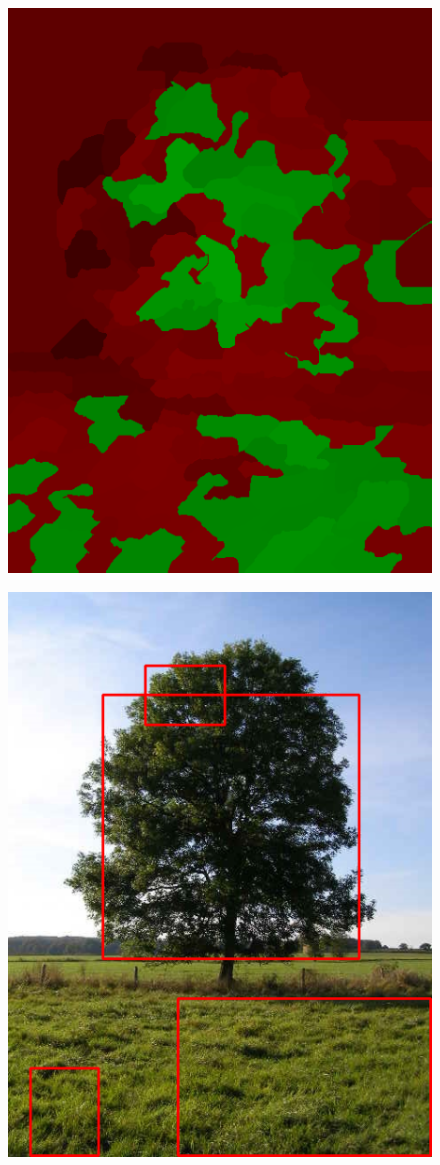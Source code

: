 \documentclass[a4paper,titlepaget]{article}
\begin{document}
\begin{figure}[htpb]
\begin{minipage}{.3\textwidth}
		\includegraphics[width=1.2\textwidth]{images/results/4map}
	\end{minipage}  
\end{figure}
\begin{figure}[htpb]
	\centering
	\includegraphics[width=.6\textwidth]{images/results/4fin}
\end{figure}
\end{document}
